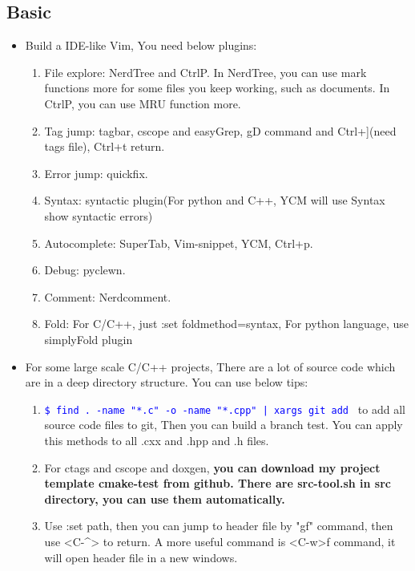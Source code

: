 \documentclass[a4paper,11pt,twoside]{book}
\newcommand{\linuxcommand}[1]{\texttt{\textcolor{blue}{\$ #1 \Pisymbol{psy}{191}}}}
\begin{document}
\subsection{Basic}
\begin{itemize}
		\item Build a IDE-like Vim, You need below plugins:
		\begin{enumerate}
				\item File explore: NerdTree and CtrlP. In NerdTree, you can use mark functions more for some files you keep working, such as documents. In CtrlP, you can use MRU function more. 

				\item Tag jump: tagbar, cscope and easyGrep, gD command and Ctrl+](need tags file), Ctrl+t return.

				\item Error jump: quickfix.

				\item Syntax: syntactic plugin(For python and C++, YCM will use Syntax show syntactic errors)

				\item Autocomplete: SuperTab, Vim-snippet, YCM, Ctrl+p.

				\item Debug: pyclewn.

				\item Comment: Nerdcomment.

				\item Fold: For C/C++, just :set foldmethod=syntax, For python language, use simplyFold plugin 
		\end{enumerate}

	\item For some large scale C/C++ projects, There are a lot of source code which are in a deep directory structure. You can use below tips:

\begin{enumerate}
		\item \linuxcommand{find . -name "*.c" -o -name "*.cpp" | xargs git add} to add all source code files to git, Then you can build a branch test. You can apply this methods to all .cxx and .hpp and .h files. 
				
		\item For ctags and cscope and doxgen, \textbf{you can download my project template cmake-test from github. There are src-tool.sh in src directory, you can use them automatically.}

		\item Use :set path, then you can jump to header file by "gf" command, then use <C-\^{}> to return. A more useful command is <C-w>f command, it will open header file in a new windows.  


\end{enumerate}
\end{itemize}
\end{document}
